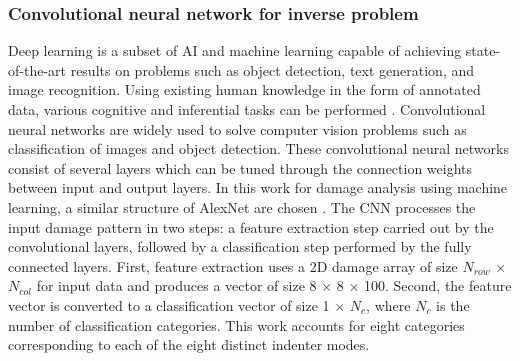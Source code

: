 \subsubsection{Convolutional neural network for inverse problem}
\label{subsubsec3}
Deep learning is a subset of AI and machine learning capable of achieving state-of-the-art results on problems such as object detection, text generation, and image recognition.
Using existing human knowledge in the form of annotated data, various cognitive and inferential tasks can be performed \cite{Ref23,Ref24,Ref25}.
Convolutional neural networks are widely used to solve computer vision problems such as classification of images and object detection.
These convolutional neural networks consist of several layers which can be tuned through the connection weights between input and output layers.
In this work for damage analysis using machine learning, a similar structure of AlexNet are chosen \cite{Ref26}.
The CNN processes the input damage pattern in two steps: a feature extraction step carried out by the convolutional layers, followed by a classification step performed by the fully connected layers.
First, feature extraction uses a 2D damage array of size $N_{row}$ $\times$ $N_{col}$ for input data and produces a vector of size 8 $\times$ 8 $\times$ 100.
Second, the feature vector is converted to a classification vector of size 1 $\times$ $N_{c}$, where $N_{c}$ is the number of classification categories.
This work accounts for eight categories corresponding to each of the eight distinct indenter modes.

